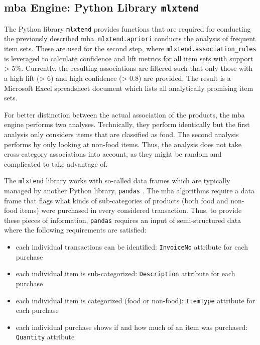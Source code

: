 \subsection{\acs{mba} Engine: Python Library \texttt{mlxtend}}
The Python library \texttt{mlxtend} provides functions that are required for conducting the previously described \ac{mba}. \texttt{mlxtend.apriori} conducts the analysis of frequent item sets. These are used for the second step, where \texttt{mlxtend.association\_rules} is leveraged to calculate confidence and lift metrics \cite{mlxtend} for all item sets with support > 5\%. Currently, the resulting associations are filtered such that only those with a high lift (> 6) and high confidence (> 0.8) are provided. The result is a Microsoft Excel spreadsheet document which lists all analytically promising item sets.

For better distinction between the actual association of the products, the \ac{mba} engine performs two analyses. Technically, they perform identically but the first analysis only considers items that are classified as food. The second analysis performs by only looking at non-food items. Thus, the analysis does not take cross-category associations into account, as they might be random and complicated to take advantage of.

The \texttt{mlxtend} library works with so-called data frames which are typically managed by another Python library, \texttt{pandas} \cite{pandas}. The \ac{mba} algorithms require a data frame that flags what kinds of sub-categories of products (both food and non-food items) were purchased in every considered transaction. Thus, to provide these pieces of information, \texttt{pandas} requires an input of semi-structured data \cite{pandas} where the following requirements are satisfied:

\begin{itemize}
	\item each individual transactions can be identified: \texttt{InvoiceNo} attribute for each purchase
	\item each individual item is sub-categorized: \texttt{Description} attribute for each purchase
	\item each individual item is categorized (food or non-food): \texttt{ItemType} attribute for each purchase
	\item each individual purchase shows if and how much of an item was purchased: \texttt{Quantity} attribute
\end{itemize}

